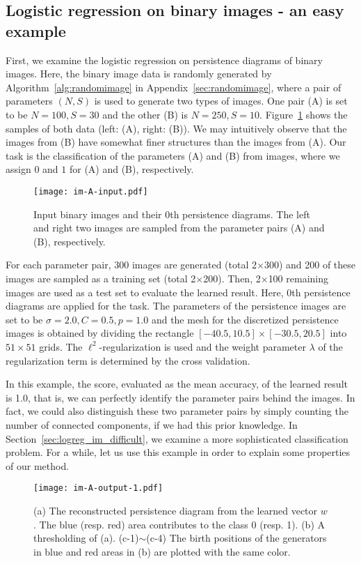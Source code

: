 \documentclass[smallextended]{svjour3}
\begin{document}
\subsection{Logistic regression on binary images - an easy example}\label{sec:easy}
First, we examine the logistic regression on persistence diagrams of binary images. 
Here, the binary image data is randomly generated by 
Algorithm~\ref{alg:randomimage} in Appendix~\ref{sec:randomimage}, where 
a pair of parameters $(N,S)$ is used to generate two types of images.
One pair (A) is set to be $N=100, S=30$ and the other (B) is $N=250, S=10$. Figure~\ref{fig:input_im_A} shows the samples of both data (left: (A), right: (B)). We may intuitively observe that the images from (B) have somewhat finer structures than the images from (A). Our task is the classification of the parameters (A) and (B) from images, where we assign $0$ and $1$ for (A) and (B), respectively. 
\begin{figure}[htbp]
  \centering
  \texttt{[image: im-A-input.pdf]}
  \caption{Input binary images and their 0th persistence diagrams.
    The left and right two images are sampled from the parameter pairs (A) and (B), respectively. }
  \label{fig:input_im_A}
\end{figure}


For each parameter pair, 300 images are generated (total 2$\times$300) and 
200 of these images are sampled as a training set (total 2$\times$200). 
Then, 2$\times$100 remaining images are used as a test set to evaluate the learned result. 
Here, 0th persistence diagrams are applied for the task. The parameters of the persistence images are set to be $\sigma=2.0, C=0.5, p = 1.0$ and the mesh for the discretized persistence images is obtained by dividing the rectangle $[-40.5, 10.5]\times[-30.5,20.5]$ into $51\times 51$ grids. The $\ell^2$-regularization is used and the weight parameter $\lambda$ of the regularization term is determined by the cross validation.


In this example, the score, evaluated as the mean accuracy, of the learned result is 1.0, that is, we can perfectly identify the parameter pairs behind the images. In fact, we could also distinguish  these two parameter pairs by simply counting the number of connected components, if we had this prior knowledge. 
In Section~\ref{sec:logreg_im_difficult}, we examine a more sophisticated classification problem. For a while, let us use this example in order to explain some properties of our method. 


\begin{figure}[htbp]
  \centering
  \texttt{[image: im-A-output-1.pdf]}
  \caption{(a) The reconstructed persistence diagram from the learned vector $w$. The blue (resp. red) area contributes to the class 0 (resp. 1). (b) A thresholding of (a). (c-1)$\sim$(c-4) The birth positions 
  of the generators in blue and red areas in (b) are plotted with the same color. }
  \label{fig:output_im_A_1}
\end{figure}
\end{document}
